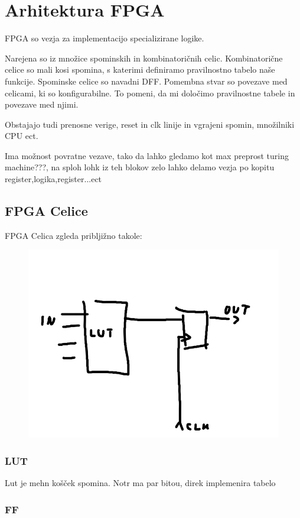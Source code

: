 \section{Arhitektura FPGA} \label{a}
FPGA so vezja za implementacijo specializirane logike.

Narejena so iz množice spominskih in kombinatoričnih celic.
Kombinatorične celice so mali kosi spomina, s katerimi definiramo pravilnostno tabelo naše funkcije.
Spominske celice so navadni DFF.
Pomembna stvar so povezave med celicami, ki so konfigurabilne. To pomeni, da mi določimo pravilnostne tabele in povezave med njimi. 

Obstajajo tudi prenosne verige, reset in clk linije in vgrajeni spomin, množilniki CPU ect.

Ima možnost povratne vezave, tako da lahko gledamo kot max preprost turing machine???, na sploh lohk iz teh blokov zelo lahko delamo vezja po kopitu register,logika,register...ect


\subsection{FPGA Celice}
FPGA Celica zgleda pribljižno takole:

\begin{figure}
	\centering
	\includegraphics[width=0.7\linewidth]{slike/cell}
	\caption{}
	\label{fig:cell}
\end{figure}

\subsubsection{LUT}

Lut je mehn košček spomina. Notr ma par bitou, direk implemenira tabelo

\subsubsection{FF}

